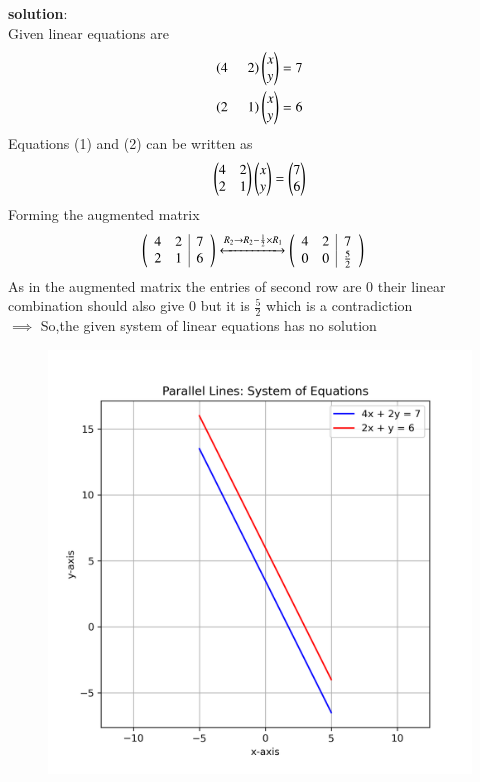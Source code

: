 \documentclass[journal]{IEEEtran}
\begin{document}
\textbf{solution}:\\
Given linear equations are
\begin{align}
    \left(4\hspace{0.5cm} 2\right)\begin{pmatrix}x\\y\end{pmatrix}=7\\
     \left(2\hspace{0.5cm} 1\right)\begin{pmatrix}x\\y\end{pmatrix}=6
\end{align}
Equations (1) and (2) can be written as
\begin{align}
    \begin{pmatrix}
        4 & 2\\
        2 & 1
    \end{pmatrix} \begin{pmatrix}x\\y\end{pmatrix}=\begin{pmatrix}7\\6\end{pmatrix}
\end{align}
Forming the augmented matrix
\begin{align}
     \left(\begin{array}{cc|c}
        4 & 2 & 7 \\
        2 & 1 & 6 
\end{array}\right) &\xleftrightarrow{R_2 \rightarrow R_2- \frac{1}{2} \times R_1}  \left(\begin{array}{cc|c}
        4 & 2 & 7 \\
        0 & 0 & \frac{5}{2} 
\end{array}\right)
\end{align}
As in the augmented matrix the entries of second  row are 0 their linear combination should also give 0 but it is  $\frac{5}{2}$ which is a contradiction\\
$\implies$ So,the given system of linear equations has no solution
\begin{figure}
    \centering
    \includegraphics[width=0.54\columnwidth]{figs/01.png}
    \caption{}
    \label{fig:placeholder}
\end{figure}
\end{document}
